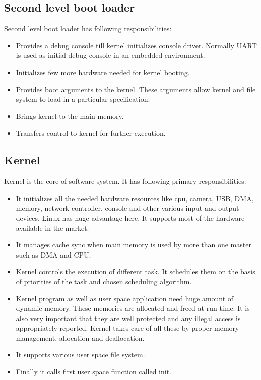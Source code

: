 \subsection {Second level boot loader}
\indent Second level boot loader has following responsibilities:
\begin{itemize}
	\item Provides a debug console till kernel initializes
		console driver. Normally UART is used as initial debug
		console in an embedded environment.
	\item Initializes few more hardware needed for kernel booting.
	\item Provides boot arguments to the kernel. These arguments
		allow kernel and file system to load in a particular
		specification.
	\item Brings kernel to the main memory.
	\item Transfers control to kernel for further execution.
\end{itemize}
\subsection {Kernel}
\indent Kernel is the core of software system. It has following primary
responsibilities:
\begin{itemize}
	\item It initializes all the needed hardware resources like
		cpu, camera, USB, DMA, memory, network controller,
		console and other various input and output devices.
		Linux has huge advantage here. It supports most of the
		hardware available in the market.
	\item It manages cache sync when main memory is used by more
		than one master such as DMA and CPU.
	\item Kernel controls the execution of different task. It
		schedules them on the basis of priorities of the task
		and chosen scheduling algorithm.
	\item Kernel program as well as user space application need huge
		amount of dynamic memory. These memories are allocated
		and freed at run time. It is also very important that
		they are well protected and any illegal access is
		appropriately reported. Kernel takes care of all these
		by proper memory management, allocation and
		deallocation.
	\item It supports various user space file system.
	\item Finally it calls first user space function called init.
\end{itemize}
